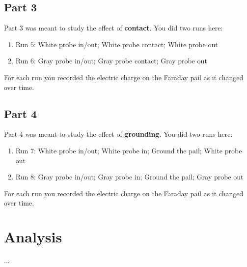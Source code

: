 \subsection{Part 3}
Part 3 was meant to study the effect of \textbf{contact}. You did two runs here:
\begin{enumerate}
	\item Run 5: White probe in/out; White probe contact; White probe out
	\item Run 6: Gray probe in/out; Gray probe contact; Gray probe out
\end{enumerate}
For each run you recorded the electric charge on the Faraday pail as it changed over time.
\subsection{Part 4}
Part 4 was meant to study the effect of \textbf{grounding}. You did two runs here:
\begin{enumerate}
	\item Run 7: White probe in/out; White probe in; Ground the pail; White probe out
	\item Run 8: Gray probe in/out; Gray probe in; Ground the pail; Gray probe out
\end{enumerate}
For each run you recorded the electric charge on the Faraday pail as it changed over time.
\section{Analysis}
...
